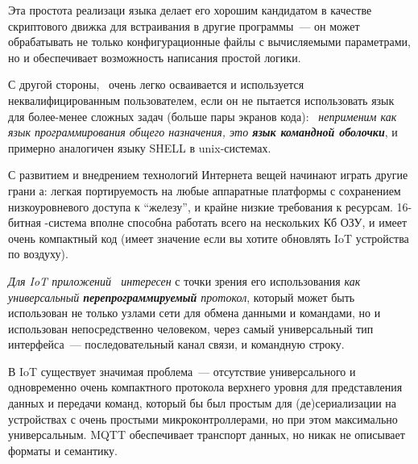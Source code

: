Эта простота реализаци языка делает его хорошим кандидатом в качестве
скриптового движка для встраивания в другие программы\ --- он может обрабатывать
не только конфигурационные файлы с вычисляемыми параметрами, но и обеспечивает
возможность написания простой логики.

С другой стороны, \F\ очень легко осваивается и используется неквалифицированным
пользователем, если он не пытается использовать язык для более-менее сложных
задач (больше пары экранов кода): \emph{\F\ неприменим как язык программирования
общего назначения, это \textbf{язык командной оболочки}}, и примерно аналогичен
языку SHELL в unix-системах.

\clearpage
С развитием и внедрением технологий Интернета вещей начинают играть другие грани
\F а: легкая портируемость на любые аппаратные платформы с сохранением
низкоуровневого доступа к ``железу'', и крайне низкие требования к ресурсам.
16-битная \F-система вполне способна работать всего на нескольких Кб ОЗУ, и
имеет очень компактный код (имеет значение если вы хотите обновлять IoT
устройства по воздуху).

\emph{Для IoT приложений \F\ интересен} с точки зрения его использования
\emph{как универсальный \textbf{перепрограммируемый} протокол}, который может
быть использован не только узлами сети для обмена данными и командами, но и
использован непосредственно человеком, через самый универсальный тип интерфейса\
--- последовательный канал связи, и командную строку.

В IoT существует значимая проблема\ --- отсутствие универсального и одновременно
очень компактного протокола верхнего уровня для представления данных и передачи
команд, который бы был простым для (де)сери\-али\-зации на устройствах с очень
простыми микроконтроллерами, но при этом максимально универсальным. MQTT
обеспечивает транспорт данных, но никак не описывает форматы и семантику.
